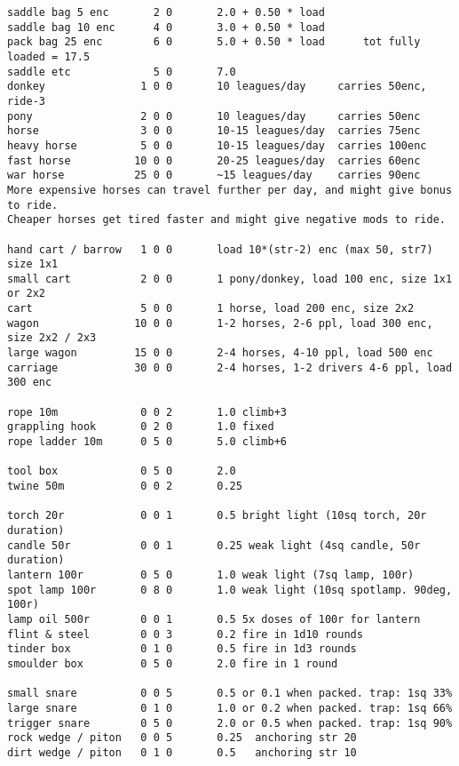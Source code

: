 \begin{verbatim}
saddle bag 5 enc       2 0       2.0 + 0.50 * load
saddle bag 10 enc      4 0       3.0 + 0.50 * load
pack bag 25 enc        6 0       5.0 + 0.50 * load      tot fully loaded = 17.5
saddle etc             5 0       7.0
donkey               1 0 0       10 leagues/day     carries 50enc, ride-3
pony                 2 0 0       10 leagues/day     carries 50enc
horse                3 0 0       10-15 leagues/day  carries 75enc
heavy horse          5 0 0       10-15 leagues/day  carries 100enc
fast horse          10 0 0       20-25 leagues/day  carries 60enc
war horse           25 0 0       ~15 leagues/day    carries 90enc
More expensive horses can travel further per day, and might give bonus to ride.
Cheaper horses get tired faster and might give negative mods to ride.

hand cart / barrow   1 0 0       load 10*(str-2) enc (max 50, str7) size 1x1
small cart           2 0 0       1 pony/donkey, load 100 enc, size 1x1 or 2x2
cart                 5 0 0       1 horse, load 200 enc, size 2x2
wagon               10 0 0       1-2 horses, 2-6 ppl, load 300 enc, size 2x2 / 2x3
large wagon         15 0 0       2-4 horses, 4-10 ppl, load 500 enc
carriage            30 0 0       2-4 horses, 1-2 drivers 4-6 ppl, load 300 enc

rope 10m             0 0 2       1.0 climb+3
grappling hook       0 2 0       1.0 fixed
rope ladder 10m      0 5 0       5.0 climb+6

tool box             0 5 0       2.0
twine 50m            0 0 2       0.25

torch 20r            0 0 1       0.5 bright light (10sq torch, 20r duration)
candle 50r           0 0 1       0.25 weak light (4sq candle, 50r duration)
lantern 100r         0 5 0       1.0 weak light (7sq lamp, 100r)
spot lamp 100r       0 8 0       1.0 weak light (10sq spotlamp. 90deg, 100r)
lamp oil 500r        0 0 1       0.5 5x doses of 100r for lantern
flint & steel        0 0 3       0.2 fire in 1d10 rounds
tinder box           0 1 0       0.5 fire in 1d3 rounds
smoulder box         0 5 0       2.0 fire in 1 round

small snare          0 0 5       0.5 or 0.1 when packed. trap: 1sq 33%
large snare          0 1 0       1.0 or 0.2 when packed. trap: 1sq 66%
trigger snare        0 5 0       2.0 or 0.5 when packed. trap: 1sq 90%
rock wedge / piton   0 0 5       0.25  anchoring str 20
dirt wedge / piton   0 1 0       0.5   anchoring str 10
\end{verbatim}
\normalsize






